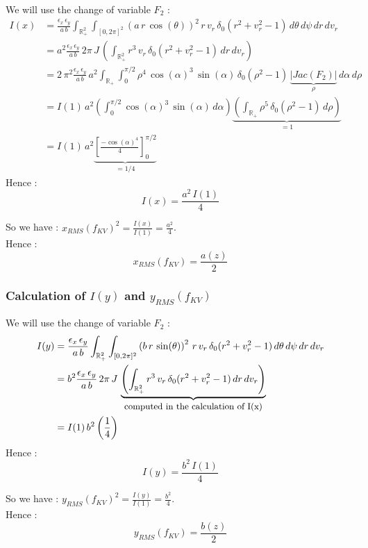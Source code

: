 \documentclass[10pt]{article}
\begin{document}
We will use the change of variable $F_2$ : \\
\begin{align*}
I(x) &= \frac{\epsilon_{x}\,\epsilon_{y}}{a\,b}\int_{\mathbb{R}_{+}^2}\int_{[0,2\pi]^2} \left(a\,r\,\cos(\theta)\right)^2\,r\,v_r\,\delta_{0}(r^2+v_r^2-1)\,d\theta\,d\psi\,dr\,dv_r \\
&= a^2\frac{\epsilon_{x}\,\epsilon_{y}}{a\,b}\,2\pi\,J\,\left(\int_{\mathbb{R}_{+}^2} r^3\,v_r\,\delta_{0}(r^2+v_r^2-1)\,dr\,dv_r\right) \\
&= 2\,\pi^{2}\frac{\epsilon_{x}\,\epsilon_{y}}{a\,b}\,a^2\int_{\mathbb{R}_{+}}\int_{0}^{\pi/2} \rho^{4}\,\cos(\alpha)^3\,\sin(\alpha)\,\delta_{0}(\rho^{2}-1)\,\underbrace{|Jac(F_2)|}_{\rho}\,d\alpha\,d\rho \\
&= I(1)\,a^2 \left(\int_{0}^{\pi/2} \cos(\alpha)^3\,\sin(\alpha)\,d\alpha\right) \underbrace{\left(\int_{\mathbb{R}_{+}}\rho^{5}\,\delta_{0}(\rho^{2}-1)\,d\rho \right)}_{= 1} \\
&= I(1)\,a^2 \underbrace{\left[\frac{-\cos(\alpha)^4}{4}\right]_{0}^{\pi/2}}_{= 1/4}
\end{align*}
Hence :
$$\boxed{I(x) = \frac{a^2\,I(1)}{4}}$$

So we have : $x_{RMS}(f_{KV})^2 = \frac{I(x)}{I(1)} = \frac{a^2}{4}$. \\
Hence : 
$$\boxed{x_{RMS}(f_{KV}) = \frac{a(z)}{2}}$$


\subsubsection{Calculation of $I(y)$ and $y_{RMS}(f_{KV})$}


We will use the change of variable $F_2$ : \\
\begin{align*}
I(y) &= \frac{\epsilon_{x}\,\epsilon_{y}}{a\,b}\int_{\mathbb{R}_{+}^2}\int_{[0,2\pi]^2} \left(b\,r\,\sin(\theta)\right)^2\,r\,v_r\,\delta_{0}(r^2+v_r^2-1)\,d\theta\,d\psi\,dr\,dv_r \\
&= b^2\frac{\epsilon_{x}\,\epsilon_{y}}{a\,b}\,2\pi\,J\,\underbrace{\left(\int_{\mathbb{R}_{+}^2} r^3\,v_r\,\delta_{0}(r^2+v_r^2-1)\,dr\,dv_r\right)}_{\mbox{{\small computed in the calculation of I(x)}}} \\
&= I(1)\,b^2 \left(\frac{1}{4}\right) 
\end{align*}
Hence :
$$\boxed{I(y) = \frac{b^2\,I(1)}{4}}$$

So we have : $y_{RMS}(f_{KV})^2 = \frac{I(y)}{I(1)} = \frac{b^2}{4}$. \\
Hence : 
$$\boxed{y_{RMS}(f_{KV}) = \frac{b(z)}{2}}$$
\end{document}
